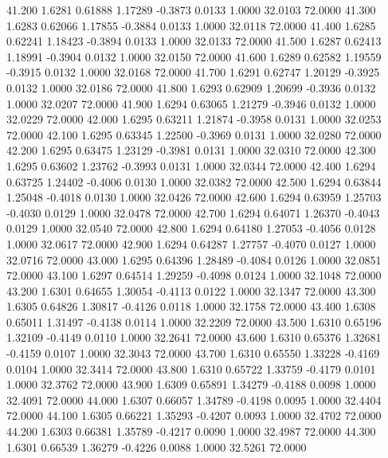   41.200   1.6281   0.61888   1.17289  -0.3873   0.0133   1.0000  32.0103  72.0000
  41.300   1.6283   0.62066   1.17855  -0.3884   0.0133   1.0000  32.0118  72.0000
  41.400   1.6285   0.62241   1.18423  -0.3894   0.0133   1.0000  32.0133  72.0000
  41.500   1.6287   0.62413   1.18991  -0.3904   0.0132   1.0000  32.0150  72.0000
  41.600   1.6289   0.62582   1.19559  -0.3915   0.0132   1.0000  32.0168  72.0000
  41.700   1.6291   0.62747   1.20129  -0.3925   0.0132   1.0000  32.0186  72.0000
  41.800   1.6293   0.62909   1.20699  -0.3936   0.0132   1.0000  32.0207  72.0000
  41.900   1.6294   0.63065   1.21279  -0.3946   0.0132   1.0000  32.0229  72.0000
  42.000   1.6295   0.63211   1.21874  -0.3958   0.0131   1.0000  32.0253  72.0000
  42.100   1.6295   0.63345   1.22500  -0.3969   0.0131   1.0000  32.0280  72.0000
  42.200   1.6295   0.63475   1.23129  -0.3981   0.0131   1.0000  32.0310  72.0000
  42.300   1.6295   0.63602   1.23762  -0.3993   0.0131   1.0000  32.0344  72.0000
  42.400   1.6294   0.63725   1.24402  -0.4006   0.0130   1.0000  32.0382  72.0000
  42.500   1.6294   0.63844   1.25048  -0.4018   0.0130   1.0000  32.0426  72.0000
  42.600   1.6294   0.63959   1.25703  -0.4030   0.0129   1.0000  32.0478  72.0000
  42.700   1.6294   0.64071   1.26370  -0.4043   0.0129   1.0000  32.0540  72.0000
  42.800   1.6294   0.64180   1.27053  -0.4056   0.0128   1.0000  32.0617  72.0000
  42.900   1.6294   0.64287   1.27757  -0.4070   0.0127   1.0000  32.0716  72.0000
  43.000   1.6295   0.64396   1.28489  -0.4084   0.0126   1.0000  32.0851  72.0000
  43.100   1.6297   0.64514   1.29259  -0.4098   0.0124   1.0000  32.1048  72.0000
  43.200   1.6301   0.64655   1.30054  -0.4113   0.0122   1.0000  32.1347  72.0000
  43.300   1.6305   0.64826   1.30817  -0.4126   0.0118   1.0000  32.1758  72.0000
  43.400   1.6308   0.65011   1.31497  -0.4138   0.0114   1.0000  32.2209  72.0000
  43.500   1.6310   0.65196   1.32109  -0.4149   0.0110   1.0000  32.2641  72.0000
  43.600   1.6310   0.65376   1.32681  -0.4159   0.0107   1.0000  32.3043  72.0000
  43.700   1.6310   0.65550   1.33228  -0.4169   0.0104   1.0000  32.3414  72.0000
  43.800   1.6310   0.65722   1.33759  -0.4179   0.0101   1.0000  32.3762  72.0000
  43.900   1.6309   0.65891   1.34279  -0.4188   0.0098   1.0000  32.4091  72.0000
  44.000   1.6307   0.66057   1.34789  -0.4198   0.0095   1.0000  32.4404  72.0000
  44.100   1.6305   0.66221   1.35293  -0.4207   0.0093   1.0000  32.4702  72.0000
  44.200   1.6303   0.66381   1.35789  -0.4217   0.0090   1.0000  32.4987  72.0000
  44.300   1.6301   0.66539   1.36279  -0.4226   0.0088   1.0000  32.5261  72.0000
